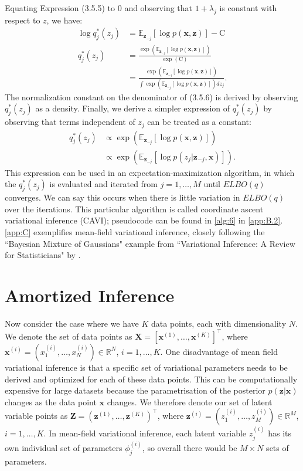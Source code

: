 \documentclass[honours,12pt]{unswthesis}
\newcommand{\R}{\mathbb{R}}
\numberwithin{equation}{section}
\theoremstyle{definition}
\begin{document}
Equating Expression (3.5.5) to 0 and observing that $1+\lambda_j$ is constant with respect to $z$, we have:
\begin{align}
\log q_j^*(z_j)&= \mathbb{E}_{\bm{z}_{-j}}[\log p(\bm{x},\bm{z})]-\text{C} \nonumber\\
q_j^*(z_j)&=\frac{\exp(\mathbb{E}_{\bm{z}_{-j}}[\log p(\bm{x},\bm{z})])}{\exp{(\text{C})}}\nonumber\\
&= \frac{\exp(\mathbb{E}_{\bm{z}_{-j}}[\log p(\bm{x},\bm{z})])}{\int \exp(\mathbb{E}_{\bm{z}_{-j}}[\log p(\bm{x},\bm{z})])dz_j}.
\end{align}
The normalization constant on the denominator of (3.5.6) is derived by observing $q^*_j(z_j)$ as a density. Finally, we derive a simpler expression of $q^*_j(z_j)$ by observing that terms independent of $z_j$ can be treated as a constant:
\begin{align}
q^*_j(z_j)&\propto \exp\left(\mathbb{E}_{\bm{z}_{-j}}[\log p(\bm{x},\bm{z})]\right)\nonumber\\
&\propto \exp\left(\mathbb{E}_{\bm{z}_{-j}}[\log p(z_j|\bm{z}_{-j},\bm{x})]\right).
\end{align}
This expression can be used in an expectation-maximization algorithm, in which the $q^*_j(z_j)$ is evaluated and iterated from $j=1,\dots, M$ until $ELBO(q)$ converges. We can say this occurs when there is little variation in $ELBO(q)$ over the iterations. This particular algorithm is called coordinate ascent variational inference (CAVI); pseudocode can be found in \autoref{alg:6} in \autoref{app:B.2}. \autoref{app:C} exemplifies mean-field variational inference, closely following the ``Bayesian Mixture of Gaussians" example from ``Variational Inference: A Review for Statisticians" by \citet{blei}.
\section{Amortized Inference}
Now consider the case where we have $K$ data points, each with dimensionality $N$. We denote the set of data points as $\bm{X}=\left[\bm{x}^{(1)},\dots,\bm{x}^{(K)}\right]^\top$, where $\bm{x}^{(i)}=(x^{(i)}_1,\dots,x^{(i)}_N)\in \R^N$, $i=1,\dots,K$. One disadvantage of mean field variational inference is that a specific set of variational parameters needs to be derived and optimized for each of these data points. This can be computationally expensive for large datasets because the parametrisation of the posterior $p(\bm{z}|\bm{x})$ changes as the data point $\bm{x}$ changes. We therefore denote our set of latent variable points as $\bm{Z}=(\bm{z}^{(1)},\dots,\bm{z}^{(K)})^\top$, where $\bm{z}^{(i)}=(z^{(i)}_1,\dots,z^{(i)}_M)\in \R^M$, $i=1,\dots,K$. In mean-field variational inference, each latent variable $z_j^{(i)}$ has its own individual set of parameters $\phi_j^{(i)}$, so overall there would be $M\times N$ sets of parameters.
\end{document}
